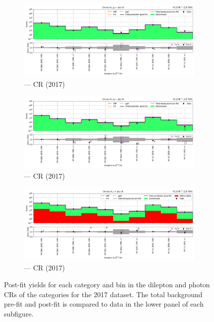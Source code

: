\begin{figure}[htbp]
    \centering
    \begin{subfigure}[b]{0.9\textwidth}
        \includegraphics[width=\textwidth]{chapters/higgstoinv/figures/mountain_ranges/2017/VH/Zmumu_tree_fit_b-abs_values_VH_cats.pdf}
        \caption{\VH --- \doubleMuCr \gls{CR} (2017)}
    \end{subfigure}

    \begin{subfigure}[b]{0.9\textwidth}
        \includegraphics[width=\textwidth]{chapters/higgstoinv/figures/mountain_ranges/2017/VH/Zee_tree_fit_b-abs_values_VH_cats.pdf}
        \caption{\VH --- \doubleEleCr \gls{CR} (2017)}
    \end{subfigure}

    \begin{subfigure}[b]{0.9\textwidth}
        \includegraphics[width=\textwidth]{chapters/higgstoinv/figures/mountain_ranges/2017/VH/Photon_tree_fit_b-abs_values_VH_cats.pdf}
        \caption{\VH --- \singlePhotonCr \gls{CR} (2017)}
    \end{subfigure}
    \caption[Post-fit yields for each category and \ptmiss bin in the dilepton and photon control regions of the \VH categories for the 2017 dataset]{Post-fit yields for each category and \ptmiss bin in the dilepton and photon \glspl{CR} of the \VH categories for the 2017 dataset. The total background pre-fit and post-fit is compared to data in the lower panel of each subfigure.}
    \label{fig:htoinv_mountain_range_2017_dilep_CRs_VH}
\end{figure}

